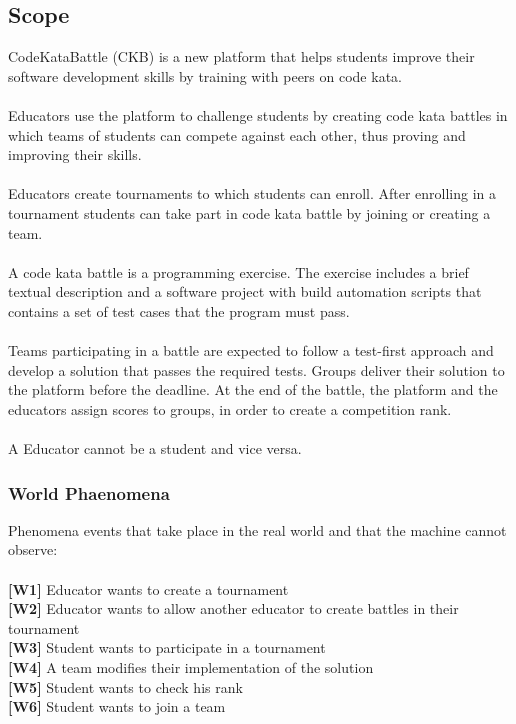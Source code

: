 \documentclass{article}
\begin{document}
\subsection{Scope}
CodeKataBattle (CKB) is a new platform that helps students improve their software development skills by training with peers on code kata. 
\\\\
Educators use the platform to challenge students by creating code kata battles in which teams of students can compete against each other, thus proving and improving their skills. 
\\\\
Educators create tournaments to which students can enroll. After enrolling in a tournament students can take part in code kata battle by joining or creating a team.
\\\\
A code kata battle is a programming exercise.
The exercise includes a brief textual description and a software project with build automation scripts that contains a set of test cases that the program must pass.
\\\\
Teams participating in a battle are expected to follow a test-first approach and develop a solution that passes the required tests. Groups deliver their solution to the platform before the deadline.
At the end of the battle, the platform and the educators assign scores to groups, in order to create a competition rank.
\\\\
A Educator cannot be a student and vice versa.
\subsubsection{World Phaenomena}
Phenomena events that take place in the real world and that the machine cannot observe:\\\\
\textbf{[W1]} Educator wants to create a tournament\\
\textbf{[W2]} Educator wants to allow another educator to create battles in their tournament\\
\textbf{[W3]} Student wants to participate in a tournament\\
\textbf{[W4]} A team modifies their implementation of the solution\\
\textbf{[W5]} Student wants to check his rank\\
\textbf{[W6]} Student wants to join a team\\
\end{document}
